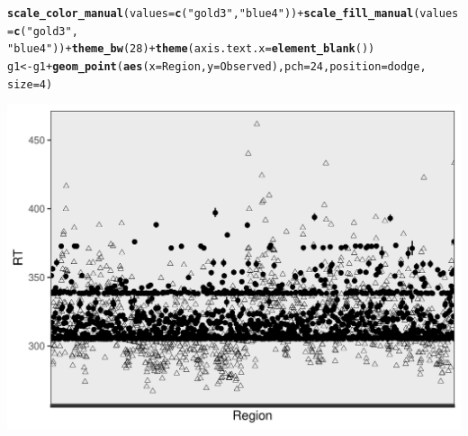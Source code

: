 \documentclass{article}\usepackage[]{graphicx}\usepackage[]{color}
\makeatletter
\def\maxwidth{ %
  \ifdim\Gin@nat@width>\linewidth
    \linewidth
  \else
    \Gin@nat@width
  \fi
}
\newcommand{\hlnum}[1]{\textcolor[rgb]{0.686,0.059,0.569}{#1}}%
\newcommand{\hlstr}[1]{\textcolor[rgb]{0.192,0.494,0.8}{#1}}%
\newcommand{\hlopt}[1]{\textcolor[rgb]{0,0,0}{#1}}%
\newcommand{\hlstd}[1]{\textcolor[rgb]{0.345,0.345,0.345}{#1}}%
\newcommand{\hlkwb}[1]{\textcolor[rgb]{0.69,0.353,0.396}{#1}}%
\newcommand{\hlkwc}[1]{\textcolor[rgb]{0.333,0.667,0.333}{#1}}%
\newcommand{\hlkwd}[1]{\textcolor[rgb]{0.737,0.353,0.396}{\textbf{#1}}}%
\newenvironment{kframe}{%
 \def\at@end@of@kframe{}%
 \ifinner\ifhmode%
  \def\at@end@of@kframe{\end{minipage}}%
  \begin{minipage}{\columnwidth}%
 \fi\fi%
 \def\FrameCommand##1{\hskip\@totalleftmargin \hskip-\fboxsep
 \colorbox{shadecolor}{##1}\hskip-\fboxsep
     \hskip-\linewidth \hskip-\@totalleftmargin \hskip\columnwidth}%
 \MakeFramed {\advance\hsize-\width
   \@totalleftmargin\z@ \linewidth\hsize
   \@setminipage}}%
 {\par\unskip\endMakeFramed%
 \at@end@of@kframe}
\newenvironment{knitrout}{}{} %
\makeatother
\begin{document}
\begin{knitrout}
\begin{kframe}
\begin{alltt}
    \hlkwd{scale_color_manual}\hlstd{(}\hlkwc{values} \hlstd{=} \hlkwd{c}\hlstd{(}\hlstr{"gold3"}\hlstd{,} \hlstr{"blue4"}\hlstd{))} \hlopt{+} \hlkwd{scale_fill_manual}\hlstd{(}\hlkwc{values} \hlstd{=} \hlkwd{c}\hlstd{(}\hlstr{"gold3"}\hlstd{,}
    \hlstr{"blue4"}\hlstd{))} \hlopt{+} \hlkwd{theme_bw}\hlstd{(}\hlnum{28}\hlstd{)} \hlopt{+} \hlkwd{theme}\hlstd{(}\hlkwc{axis.text.x} \hlstd{=} \hlkwd{element_blank}\hlstd{())}
\hlstd{g1} \hlkwb{<-} \hlstd{g1} \hlopt{+} \hlkwd{geom_point}\hlstd{(}\hlkwd{aes}\hlstd{(}\hlkwc{x} \hlstd{= Region,} \hlkwc{y} \hlstd{= Observed),} \hlkwc{pch} \hlstd{=} \hlnum{24}\hlstd{,} \hlkwc{position} \hlstd{= dodge,}
    \hlkwc{size} \hlstd{=} \hlnum{4}\hlstd{)}
\end{alltt}
\end{kframe}
\end{knitrout}

\begin{knitrout}
\color{fgcolor}
\includegraphics[width=\maxwidth]{figures/figure_ns_unnamed-chunk-22-1} 

\end{knitrout}
\end{document}
